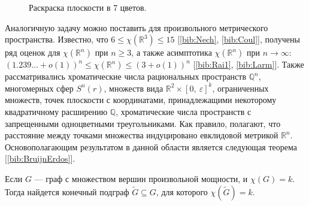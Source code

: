 \begin{figure}[h]
\centering
\captionsetup{justification=centering}
\caption{Раскраска плоскости в 7 цветов.}
\label{introduction:fig:plane}
\end{figure}

Аналогичную задачу можно поставить для произвольного метрического пространства. Известно, что 
$6 \leq \chi(\mathbb{R}^3) \leq 15$ [\ref{bib:Nech}, \ref{bib:Coul}], 
получены ряд оценок для $\chi(\mathbb{R}^n)$ при $n \ge 3$, а также асимптотика $\chi(\mathbb{R}^n)$ при $n\to\infty$: 
$(1.239...+o(1))^n\leq \chi(\mathbb{R}^n)\leq (3+o(1))^n$ [\ref{bib:Rai1}, \ref{bib:Larm}].
Также рассматривались хроматические числа рациональных пространств $\mathbb{Q}^n$, многомерных сфер $S^n(r)$, 
множеств вида $\mathbb{R}^2 \times \left[ 0,~\varepsilon \right]^{k}$, ограниченных множеств, точек плоскости с координатами, принадлежащими некоторому квадратичному расширению $\mathbb{Q}$, хроматические числа пространств с запрещенными одноцветными треугольниками. Как правило, полагают, что расстояние между точками множества индуцировано евклидовой метрикой $\mathbb{R}^n$. Основополагающим результатом в данной области является следующая теорема [\ref{bib:BruijnErdos}].


\begin{theorem1}
Если $G$ — граф с множеством вершин произвольной мощности, и $\chi(G) = k$. Тогда найдется конечный подграф  $\widetilde{G} \subseteq G$, для которого $\chi(\widetilde{G}) = k$. 
\end{theorem1}


